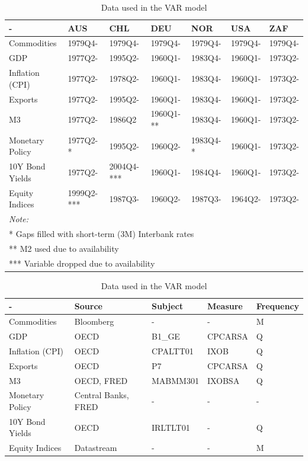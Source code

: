 \documentclass[12pt,]{article}
\begin{document}
\begin{table}[!h]

\caption{\label{tab:unnamed-chunk-2}Data used in the VAR model}
\centering
\begin{tabular}[t]{l|l|l|l|l|l|l}
\hline
- & AUS & CHL & DEU & NOR & USA & ZAF\\
\hline
Commodities & 1979Q4- & 1979Q4- & 1979Q4- & 1979Q4- & 1979Q4- & 1979Q4-\\
\hline
GDP & 1977Q2- & 1995Q2- & 1960Q1- & 1983Q4- & 1960Q1- & 1973Q2-\\
\hline
Inflation (CPI) & 1977Q2- & 1978Q2- & 1960Q1- & 1983Q4- & 1960Q1- & 1973Q2-\\
\hline
Exports & 1977Q2- & 1995Q2- & 1960Q1- & 1983Q4- & 1960Q1- & 1973Q2-\\
\hline
M3 & 1977Q2- & 1986Q2 & 1960Q1- ** & 1983Q4- & 1960Q1- & 1973Q2-\\
\hline
Monetary Policy & 1977Q2- * & 1995Q2- & 1960Q2- & 1983Q4- * & 1960Q1- & 1973Q2-\\
\hline
10Y Bond Yields & 1977Q2- & 2004Q4- *** & 1960Q1- & 1984Q4- & 1960Q1- & 1973Q2-\\
\hline
Equity Indices & 1999Q2- *** & 1987Q3- & 1960Q2- & 1987Q3- & 1964Q2- & 1973Q2-\\
\hline
\multicolumn{7}{l}{\textit{Note: }}\\
\multicolumn{7}{l}{* Gaps filled with short-term (3M) Interbank rates}\\
\multicolumn{7}{l}{** M2 used due to availability}\\
\multicolumn{7}{l}{*** Variable dropped due to availability}\\
\end{tabular}
\end{table}

\begin{table}[!h]

\caption{\label{tab:unnamed-chunk-3}Data used in the VAR model}
\centering
\begin{tabular}[t]{l|l|l|l|l}
\hline
- & Source & Subject & Measure & Frequency\\
\hline
Commodities & Bloomberg & - & - & M\\
\hline
GDP & OECD & B1\_GE & CPCARSA & Q\\
\hline
Inflation (CPI) & OECD & CPALTT01 & IXOB & Q\\
\hline
Exports & OECD & P7 & CPCARSA & Q\\
\hline
M3 & OECD, FRED & MABMM301 & IXOBSA & Q\\
\hline
Monetary Policy & Central Banks, FRED & - & - & -\\
\hline
10Y Bond Yields & OECD & IRLTLT01 & - & Q\\
\hline
Equity Indices & Datastream & - & - & M\\
\hline
\end{tabular}
\end{table}
\end{document}
